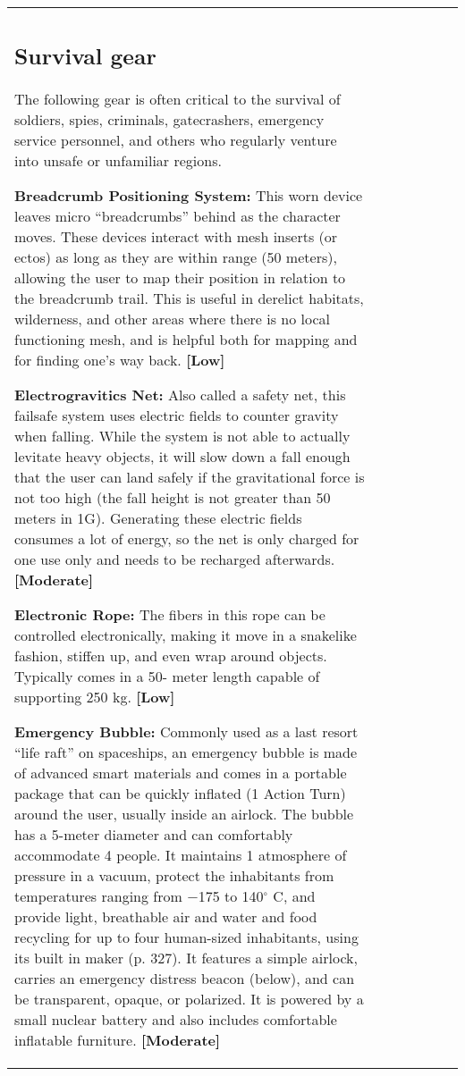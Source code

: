\begin{tabular}{|l|l|l|l|l|l|l|}
\subsection{Survival gear} \label{sec:survival-gear} 

The following gear is often critical to the survival of soldiers, spies, criminals, gatecrashers, emergency service personnel, and others who regularly venture into unsafe or unfamiliar regions. 

\textbf{Breadcrumb Positioning System:} This worn device leaves micro ``breadcrumbs'' behind as the character moves. These devices interact with mesh inserts (or ectos) as long as they are within range (50 meters), allowing the user to map their position in relation to the breadcrumb trail. This is useful in derelict habitats, wilderness, and other areas where there is no local functioning mesh, and is helpful both for mapping and for finding one’s way back. \textbf{[Low]} 

\textbf{Electrogravitics Net:} Also called a safety net, this failsafe system uses electric fields to counter gravity when falling. While the system is not able to actually levitate heavy objects, it will slow down a fall enough that the user can land safely if the gravitational force is not too high (the fall height is not greater than 50 meters in 1G). Generating these electric fields consumes a lot of energy, so the net is only charged for one use only and needs to be recharged afterwards. \textbf{[Moderate]} 

\textbf{Electronic Rope:} The fibers in this rope can be controlled electronically, making it move in a snakelike fashion, stiffen up, and even wrap around objects. Typically comes in a 50- meter length capable of supporting 250 kg. \textbf{[Low]} 

\textbf{Emergency Bubble:} Commonly used as a last resort ``life raft'' on spaceships, an emergency bubble is made of advanced smart materials and comes in a portable package that can be quickly inflated (1 Action Turn) around the user, usually inside an airlock. The bubble has a 5-meter diameter and can comfortably accommodate 4 people. It maintains 1 atmosphere of pressure in a vacuum, protect the inhabitants from temperatures ranging from $-$175 to 140$^{\circ}$ C, and provide light, breathable air and water and food recycling for up to four human-sized inhabitants, using its built in maker (p. 327). It features a simple airlock, carries an emergency distress beacon (below), and can be transparent, opaque, or polarized. It is powered by a small nuclear battery and also includes comfortable inflatable furniture. \textbf{[Moderate]} 


\end{tabular}
